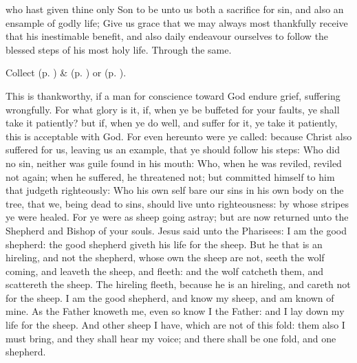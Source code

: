 \collect\label{EasterIICollect}
 who hast given thine only Son to be unto us both a sacrifice for sin, and also an ensample of godly life; Give us grace that we may always most thankfully receive that his inestimable benefit, and also daily endeavour ourselves to follow the blessed steps of his most holy life. Through the same.
\begin{rubric}
     Collect  (p. \pageref{SPMaryInEaster}) \&   (p. \pageref{SPAgainst}) or  (p. \pageref{SPChiefBishop}).
\end{rubric}
 This is thankworthy, if a man for conscience toward God endure grief, suffering wrongfully. For what glory is it, if, when ye be buffeted for your faults, ye shall take it patiently? but if, when ye do well, and suffer for it, ye take it patiently, this is acceptable with God. For even hereunto were ye called: because Christ also suffered for us, leaving us an example, that ye should follow his steps: Who did no sin, neither was guile found in his mouth: Who, when he was reviled, reviled not again; when he suffered, he threatened not; but committed himself to him that judgeth righteously: Who his own self bare our sins in his own body on the tree, that we, being dead to sins, should live unto righteousness: by whose stripes ye were healed. For ye were as sheep going astray; but are now returned unto the Shepherd and Bishop of your souls.
 Jesus said unto the Pharisees: I am the good shepherd: the good shepherd giveth his life for the sheep. But he that is an hireling, and not the shepherd, whose own the sheep are not, seeth the wolf coming, and leaveth the sheep, and fleeth: and the wolf catcheth them, and scattereth the sheep. The hireling fleeth, because he is an hireling, and careth not for the sheep. I am the good shepherd, and know my sheep, and am known of mine. As the Father knoweth me, even so know I the Father: and I lay down my life for the sheep. And other sheep I have, which are not of this fold: them also I must bring, and they shall hear my voice; and there shall be one fold, and one shepherd.
